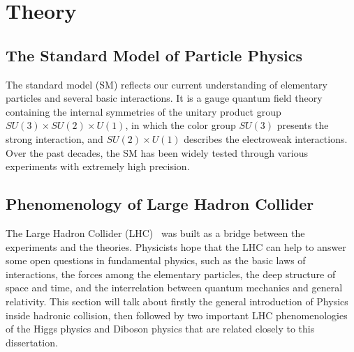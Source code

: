 
\chapter{Theory}

\section{The Standard Model of Particle Physics}
The standard model (SM) reflects our current understanding of elementary particles and several basic interactions.
It is a gauge quantum field theory containing the internal symmetries of the unitary product group $SU(3) \times SU(2) \times U(1)$, 
in which the color group $SU(3)$ presents the strong interaction, and $SU(2) \times U(1)$ describes the electroweak interactions.
Over the past decades, the SM has been widely tested through various experiments with extremely high precision.






\section{Phenomenology of Large Hadron Collider}
The Large Hadron Collider (LHC)~\cite{Bruning:2004ej, Buning:2004wk, Benedikt:2004wm} was built as a bridge between the experiments and the theories.
Physicists hope that the LHC can help to answer some open questions in fundamental physics, 
such as the basic laws of interactions, the forces among the elementary particles, 
the deep structure of space and time, and the interrelation between quantum mechanics and general relativity.
This section will talk about firstly the general introduction of Physics inside hadronic collision,
then followed by two important LHC phenomenologies of the Higgs physics and Diboson physics that are related closely to this dissertation.




